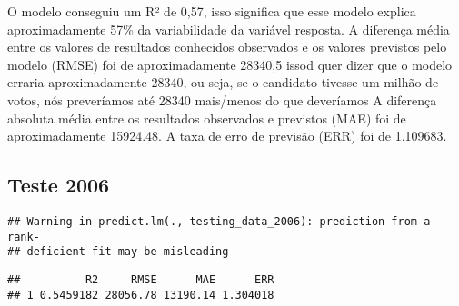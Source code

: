 \documentclass[]{article}
\newenvironment{Shaded}{\begin{snugshade}}{\end{snugshade}}
\newcommand{\KeywordTok}[1]{\textcolor[rgb]{0.13,0.29,0.53}{\textbf{#1}}}
\newcommand{\DataTypeTok}[1]{\textcolor[rgb]{0.13,0.29,0.53}{#1}}
\newcommand{\DecValTok}[1]{\textcolor[rgb]{0.00,0.00,0.81}{#1}}
\newcommand{\StringTok}[1]{\textcolor[rgb]{0.31,0.60,0.02}{#1}}
\newcommand{\OperatorTok}[1]{\textcolor[rgb]{0.81,0.36,0.00}{\textbf{#1}}}
\newcommand{\NormalTok}[1]{#1}
\begin{document}
O modelo conseguiu um R² de 0,57, isso significa que esse modelo explica
aproximadamente 57\% da variabilidade da variável resposta. A diferença
média entre os valores de resultados conhecidos observados e os valores
previstos pelo modelo (RMSE) foi de aproximadamente 28340,5 issod quer
dizer que o modelo erraria aproximadamente 28340, ou seja, se o
candidato tivesse um milhão de votos, nós preveríamos até 28340
mais/menos do que deveríamos A diferença absoluta média entre os
resultados observados e previstos (MAE) foi de aproximadamente 15924.48.
A taxa de erro de previsão (ERR) foi de 1.109683.

\subsection{Teste 2006}\label{teste-2006}

\begin{Shaded}
\end{Shaded}

\begin{verbatim}
## Warning in predict.lm(., testing_data_2006): prediction from a rank-
## deficient fit may be misleading
\end{verbatim}

\begin{Shaded}
\end{Shaded}

\begin{verbatim}
##          R2     RMSE      MAE      ERR
## 1 0.5459182 28056.78 13190.14 1.304018
\end{verbatim}
\end{document}

